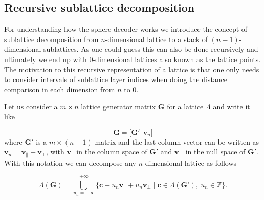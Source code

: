 \documentclass[english,12pt,a4paper,pdftex,sci,utf8]{aaltothesis}
\begin{document}
\subsection{Recursive sublattice decomposition}

For understanding how the sphere decoder works we introduce the concept of sublattice decomposition from $n$-dimensional lattice to a stack of $(n-1)$-dimensional sublattices. As one could guess this can also be done recursively and ultimately we end up with 0-dimensional lattices also known as the lattice points. The motivation to this recursive representation of a lattice is that one only needs to consider intervals of sublattice layer indices when doing the distance comparison in each dimension from $n$ to $0$.
\par Let us consider a $m \times n$ lattice generator matrix $\mathbf{G}$ for a lattice $\Lambda$ and write it like
 
\begin{equation}
\mathbf{G} = \big[\mathbf{G}' \ \ \mathbf{v}_n \big]
\label{eq:gen}
\end{equation}
where $\mathbf{G}'$ is a $m \times (n-1)$ matrix and the last column vector can be written as $\mathbf{v}_n = \mathbf{v}_{\parallel} + \mathbf{v}_{\bot}$, with $\mathbf{v}_{\parallel}$ in the column space of $\mathbf{G}'$ and $\mathbf{v}_{\bot}$ in the null space of $\mathbf{G}'$. With this notation we can decompose any $n$-dimensional lattice as follows

\begin{equation}
\Lambda(\mathbf{G}) = \bigcup_{u_n=-\infty}^{+\infty} \big\{\mathbf{c}+u_n\mathbf{v}_{\parallel}+u_n\mathbf{v}_{\bot} \mid \mathbf{c} \in \Lambda(\mathbf{G}'), \ u_n \in \mathbb{Z} \big\}.
\label{eq:decom}
\end{equation}
\end{document}
